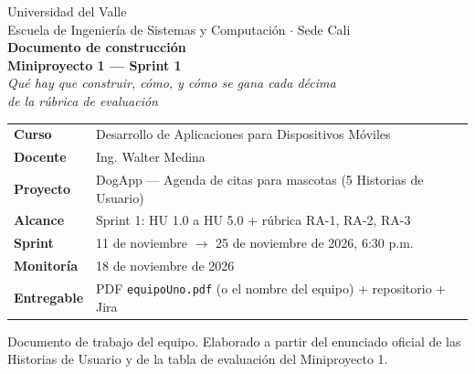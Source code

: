 \documentclass[11pt,letterpaper]{article}
\newcommand{\code}[1]{\texttt{\small #1}}
\begin{document}
\begin{titlepage}
\centering
\vspace*{0.6cm}


\vspace{1.4cm}
{\sffamily\color{muted}\large Universidad del Valle}\\[2pt]
{\sffamily\color{muted}Escuela de Ingenier\'ia de Sistemas y Computaci\'on $\cdot$ Sede Cali}\\[1.4cm]

{\sffamily\bfseries\Huge\color{dark} Documento de construcci\'on}\\[6pt]
{\sffamily\bfseries\Large\color{pinkdk} Miniproyecto 1 --- Sprint 1}\\[1.2cm]

{\large\itshape Qu\'e hay que construir, c\'omo, y c\'omo se gana cada d\'ecima\\
de la r\'ubrica de evaluaci\'on}

\vfill

\begin{tabularx}{0.86\linewidth}{@{}>{\sffamily\bfseries\color{muted}}l X@{}}
\toprule
Curso & Desarrollo de Aplicaciones para Dispositivos M\'oviles\\
Docente & Ing. Walter Medina\\
Proyecto & DogApp --- Agenda de citas para mascotas (5 Historias de Usuario)\\
Alcance & Sprint 1: HU 1.0 a HU 5.0 + r\'ubrica RA-1, RA-2, RA-3\\
Sprint & 11 de noviembre $\to$ 25 de noviembre de 2026, 6:30 p.m.\\
Monitor\'ia & 18 de noviembre de 2026\\
Entregable & PDF \code{equipoUno.\allowbreak{}pdf} (o el nombre del equipo) + repositorio + Jira\\
\bottomrule
\end{tabularx}

\vspace{1.2cm}
{\footnotesize\sffamily\color{muted}
Documento de trabajo del equipo. Elaborado a partir del enunciado oficial de las\\
Historias de Usuario y de la tabla de evaluaci\'on del Miniproyecto 1.}
\end{titlepage}
\end{document}
